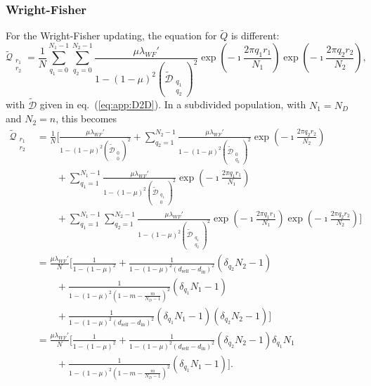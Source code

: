 \documentclass[11pt, letterpaper]{article}
\renewcommand{\eqref}[1]{\textup{{\normalfont eq.~(\ref{#1}}\normalfont)}}
\newcommand{\self}{\textrm{self}}
\newcommand{\inn}{\textrm{in}}
\newcommand{\din}{d_{\inn}}
\newcommand{\dself}{d_{\self}}
\newcommand{\ndemes}{N_D}
\begin{document}
\subsubsection{Wright-Fisher}
For the Wright-Fisher updating, the equation for $\tilde{Q}$ is different:
\begin{equation}
\tilde{\mathcal{Q}}_{\substack{r_1\\r_2}} = \frac{1}{N} \sum_{q_1=0}^{N_1-1} \sum_{q_2=0}^{N_2 -1} \frac{\mu \lambda_{WF}'}{1-(1-\mu)^2 (\tilde{\mathcal{D}}_{\substack{q_1\\q_2}})^2} \exp\left(-\imath \frac{2\pi q_1 r_1}{N_1}\right)\exp\left(-\imath \frac{2\pi q_2 r_2}{N_2}\right), 
\end{equation}
with $\tilde{\mathcal{D}}$ given in \eqref{eq:app:D2D}. In a subdivided population, with $N_1 = \ndemes$ and $N_2 = n$, this becomes
\begin{align}
\tilde{\mathcal{Q}}_{\substack{r_1\\r_2}} 
%
& = \frac{1}{N} \Bigg[ 
\frac{\mu \lambda_{WF}'}{1-(1-\mu)^2 (\tilde{\mathcal{D}}_{\substack{0\\0}})^2} 
+ \sum_{q_2=1}^{N_2-1} \frac{\mu \lambda_{WF}'}{1-(1-\mu)^2 (\tilde{\mathcal{D}}_{\substack{0\\q_2}})^2} \exp\left(-\imath \frac{2\pi q_2 r_2}{N_2}\right) \nonumber \\
& \qquad + \sum_{q_1=1}^{N_1-1} \frac{\mu \lambda_{WF}'}{1-(1-\mu)^2 (\tilde{\mathcal{D}}_{\substack{q_1\\0}})^2} \exp\left(-\imath \frac{2\pi q_1 r_1}{N_1}\right)  \nonumber \\
& \qquad + \sum_{q_1=1}^{N_1-1} \sum_{q_2=1}^{N_2 -1} \frac{\mu \lambda_{WF}'}{1-(1-\mu)^2 (\tilde{\mathcal{D}}_{\substack{q_1\\q_2}})^2} \exp\left(-\imath \frac{2\pi q_1 r_1}{N_1}\right)\exp\left(-\imath \frac{2\pi q_2 r_2}{N_2}\right)
 \Bigg] \nonumber\\
& = \frac{\mu \lambda_{WF}'}{N} \Bigg[ 
\frac{1}{1-(1-\mu)^2 } 
%
+ \frac{1}{1-(1-\mu)^2 (\dself - \din)^2} (\delta_{q_2} N_2 - 1) \nonumber \\
%
& \qquad +  \frac{1}{1-(1-\mu)^2 (1-m-\frac{m}{\ndemes-1})^2} (\delta_{q_1} N_1 - 1) \nonumber \\
%
& \qquad +  \frac{1}{1-(1-\mu)^2 (\dself - \din)^2} (\delta_{q_1} N_1 - 1)(\delta_{q_2} N_2 - 1)
 \Bigg] \nonumber\\
& = \frac{\mu \lambda_{WF}'}{N} \Bigg[ 
\frac{1}{1-(1-\mu)^2 } 
%
+ \frac{1}{1-(1-\mu)^2 (\dself - \din)^2} (\delta_{q_2} N_2 - 1) \delta_{q_1} N_1 \nonumber \\
%
& \qquad +  \frac{1}{1-(1-\mu)^2 (1-m-\frac{m}{\ndemes-1})^2} (\delta_{q_1} N_1 - 1) 
\Bigg] . \label{eq:app:Q2DWFsol}
\end{align}
\end{document}
